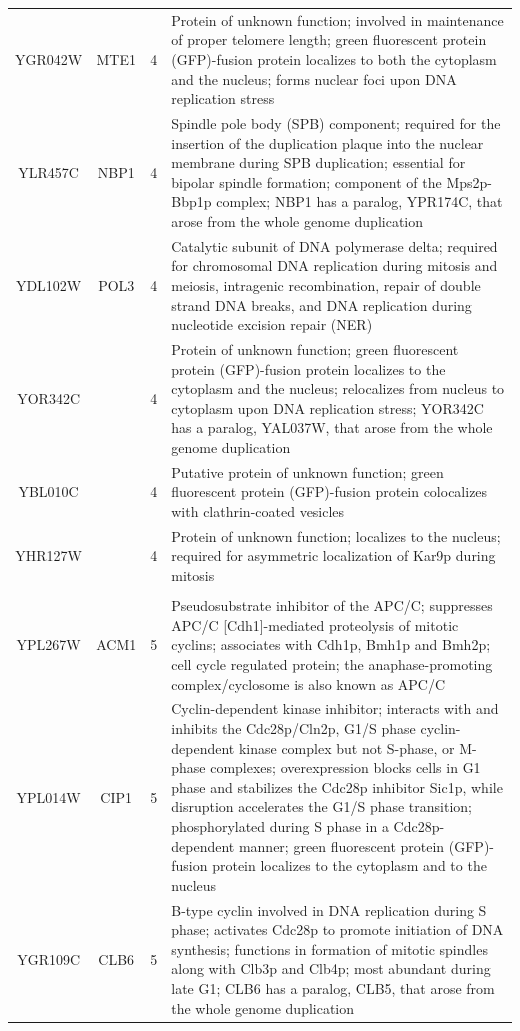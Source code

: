 \documentclass[]{article}
\begin{document}
\begin{longtable}{@{\extracolsep{3pt}} cccp{85mm}}
YGR042W & MTE1 & 4 & Protein of unknown function; involved in maintenance of proper telomere length; green fluorescent protein (GFP)-fusion protein localizes to both the cytoplasm and the nucleus; forms nuclear foci upon DNA replication stress \\ 
YLR457C & NBP1 & 4 & Spindle pole body (SPB) component; required for the insertion of the duplication plaque into the nuclear membrane during SPB duplication; essential for bipolar spindle formation; component of the Mps2p-Bbp1p complex; NBP1 has a paralog, YPR174C, that arose from the whole genome duplication \\ 
YDL102W & POL3 & 4 & Catalytic subunit of DNA polymerase delta; required for chromosomal DNA replication during mitosis and meiosis, intragenic recombination, repair of double strand DNA breaks, and DNA replication during nucleotide excision repair (NER) \\ 
YOR342C &  & 4 & Protein of unknown function; green fluorescent protein (GFP)-fusion protein localizes to the cytoplasm and the nucleus; relocalizes from nucleus to cytoplasm upon DNA replication stress; YOR342C has a paralog, YAL037W, that arose from the whole genome duplication \\ 
YBL010C &  & 4 & Putative protein of unknown function; green fluorescent protein (GFP)-fusion protein colocalizes with clathrin-coated vesicles \\ 
YHR127W &  & 4 & Protein of unknown function; localizes to the nucleus; required for asymmetric localization of Kar9p during mitosis \\   \hline \\ [-1.8ex] 
YPL267W & ACM1 & 5 & Pseudosubstrate inhibitor of the APC/C; suppresses APC/C [Cdh1]-mediated proteolysis of mitotic cyclins; associates with Cdh1p, Bmh1p and Bmh2p; cell cycle regulated protein; the anaphase-promoting complex/cyclosome is also known as APC/C \\ 
YPL014W & CIP1 & 5 & Cyclin-dependent kinase inhibitor; interacts with and inhibits the Cdc28p/Cln2p, G1/S phase cyclin-dependent kinase complex but not S-phase, or M-phase complexes; overexpression blocks cells in G1 phase and stabilizes the Cdc28p inhibitor Sic1p, while disruption accelerates the G1/S phase transition; phosphorylated during S phase in a Cdc28p-dependent manner; green fluorescent protein (GFP)-fusion protein localizes to the cytoplasm and to the nucleus \\ 
YGR109C & CLB6 & 5 & B-type cyclin involved in DNA replication during S phase; activates Cdc28p to promote initiation of DNA synthesis; functions in formation of mitotic spindles along with Clb3p and Clb4p; most abundant during late G1; CLB6 has a paralog, CLB5, that arose from the whole genome duplication \\ 

\end{longtable}
\end{document}
